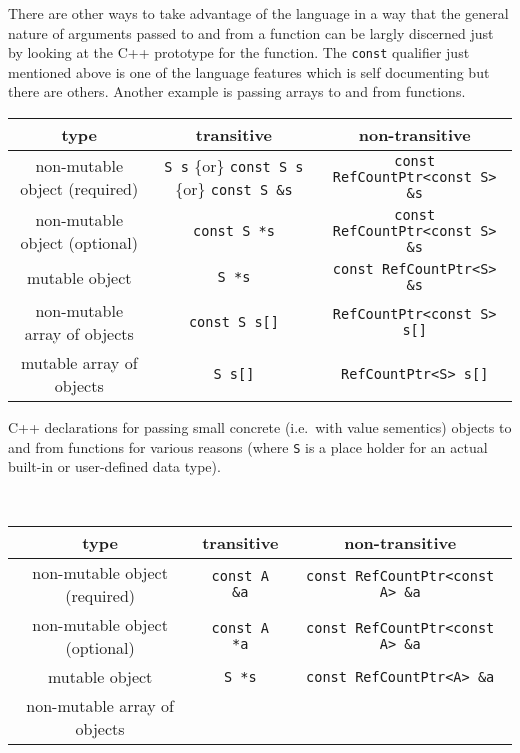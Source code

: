 There are other ways to take advantage of the language in a way that
the general nature of arguments passed to and from a function can be
largly discerned just by looking at the C++ prototype for the
function.  The \texttt{const} qualifier just mentioned above is one of the language
features which is self documenting but there are others.  Another
example is passing arrays to and from functions.

\begin{table}
%
\begin{minipage}{\textwidth}
\begin{tabular}{|c|c|c|}
\hline
type
& transitive
& non-transitive \\
\hline
non-mutable object (required)
& \texttt{S s} \{or\} \texttt{const S s} \{or\} \texttt{const S \&s}
& \texttt{const RefCountPtr<const S> \&s} \\
\hline
non-mutable object (optional)
& \texttt{const S *s}
& \texttt{const RefCountPtr<const S> \&s} \\
\hline
mutable object
& \texttt{S *s}
& \texttt{const RefCountPtr<S> \&s} \\
\hline
non-mutable array of objects
& \texttt{const S s[]}
& \texttt{RefCountPtr<const S> s[]} \\
\hline
mutable array of objects
& \texttt{S s[]}
& \texttt{RefCountPtr<S> s[]} \\
\hline
\end{tabular}
\begin{center}
C++ declarations for passing small concrete (i.e.~with value
sementics) objects to and from functions for various reasons (where
\texttt{S} is a place holder for an actual built-in or user-defined
data type).
\end{center}
\end{minipage}
%
\\[5ex]
%
\begin{minipage}{\textwidth}
\begin{tabular}{|c|c|c|}
\hline
type
& transitive
& non-transitive \\
\hline
non-mutable object (required)
& \texttt{const A \&a}
& \texttt{const RefCountPtr<const A> \&a} \\
\hline
non-mutable object (optional)
& \texttt{const A *a}
& \texttt{const RefCountPtr<const A> \&a} \\
\hline
mutable object
& \texttt{S *s}
& \texttt{const RefCountPtr<A> \&a} \\
\hline
non-mutable array of objects

\end{tabular}
\end{minipage}
\end{table}
